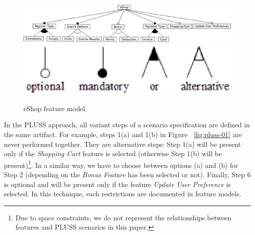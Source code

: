 \documentclass{report}
\begin{document}
\begin{frontmatter}
 \begin{figure}[h]
 \begin{center}
  \includegraphics[scale=0.25]{img/eShop-fm3.eps}
   \includegraphics[scale=0.30]{img/fm-notation.eps}
  \nocaptionrule \caption{eShop feature model.}
  \label{fig:eshop-fm}
  \end{center}
\end{figure}




In the PLUSS approach, all variant steps of a scenario specification are defined
in the same artifact. For example, steps 1(a) and 1(b) in Figure
~\ref{fig:pluss-01} are never performed together. They are alternative steps:
Step 1(a) will be present only if the \emph{Shopping Cart} feature is selected
(otherwise Step 1(b) will be present)\footnote{Due to space constraints, we
do not represent the relationships between features and PLUSS scenarios in this
paper.}. In a similar way, we have to choose between options (a) and (b) for
Step 2 (depending on the \emph{Bonus Feature} has been selected or not). Finally, Step 6 is optional and will be present only if the feature \emph{Update User Preference} is selected. In this technique, such
restrictions are documented in feature models.


\end{frontmatter}
\end{document}

